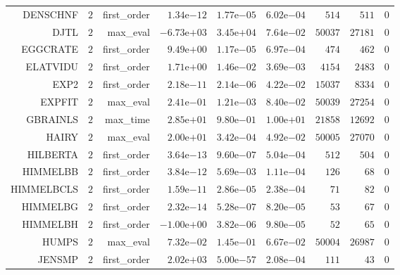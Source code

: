 \begin{longtable}{rrrrrrrrr}
DENSCHNF & \(     2\) & first\_order & \( 1.34\)e\(-12\) & \( 1.77\)e\(-05\) & \( 6.02\)e\(-04\) & \(   514\) & \(   511\) & \(     0\) \\
DJTL & \(     2\) & max\_eval & \(-6.73\)e\(+03\) & \( 3.45\)e\(+04\) & \( 7.64\)e\(-02\) & \( 50037\) & \( 27181\) & \(     0\) \\
EGGCRATE & \(     2\) & first\_order & \( 9.49\)e\(+00\) & \( 1.17\)e\(-05\) & \( 6.97\)e\(-04\) & \(   474\) & \(   462\) & \(     0\) \\
ELATVIDU & \(     2\) & first\_order & \( 1.71\)e\(+00\) & \( 1.46\)e\(-02\) & \( 3.69\)e\(-03\) & \(  4154\) & \(  2483\) & \(     0\) \\
EXP2 & \(     2\) & first\_order & \( 2.18\)e\(-11\) & \( 2.14\)e\(-06\) & \( 4.22\)e\(-02\) & \( 15037\) & \(  8334\) & \(     0\) \\
EXPFIT & \(     2\) & max\_eval & \( 2.41\)e\(-01\) & \( 1.21\)e\(-03\) & \( 8.40\)e\(-02\) & \( 50039\) & \( 27254\) & \(     0\) \\
GBRAINLS & \(     2\) & max\_time & \( 2.85\)e\(+01\) & \( 9.80\)e\(-01\) & \( 1.00\)e\(+01\) & \( 21858\) & \( 12692\) & \(     0\) \\
HAIRY & \(     2\) & max\_eval & \( 2.00\)e\(+01\) & \( 3.42\)e\(-04\) & \( 4.92\)e\(-02\) & \( 50005\) & \( 27070\) & \(     0\) \\
HILBERTA & \(     2\) & first\_order & \( 3.64\)e\(-13\) & \( 9.60\)e\(-07\) & \( 5.04\)e\(-04\) & \(   512\) & \(   504\) & \(     0\) \\
HIMMELBB & \(     2\) & first\_order & \( 3.84\)e\(-12\) & \( 5.69\)e\(-03\) & \( 1.11\)e\(-04\) & \(   126\) & \(    68\) & \(     0\) \\
HIMMELBCLS & \(     2\) & first\_order & \( 1.59\)e\(-11\) & \( 2.86\)e\(-05\) & \( 2.38\)e\(-04\) & \(    71\) & \(    82\) & \(     0\) \\
HIMMELBG & \(     2\) & first\_order & \( 2.32\)e\(-14\) & \( 5.28\)e\(-07\) & \( 8.20\)e\(-05\) & \(    53\) & \(    67\) & \(     0\) \\
HIMMELBH & \(     2\) & first\_order & \(-1.00\)e\(+00\) & \( 3.82\)e\(-06\) & \( 9.80\)e\(-05\) & \(    52\) & \(    65\) & \(     0\) \\
HUMPS & \(     2\) & max\_eval & \( 7.32\)e\(-02\) & \( 1.45\)e\(-01\) & \( 6.67\)e\(-02\) & \( 50004\) & \( 26987\) & \(     0\) \\
JENSMP & \(     2\) & first\_order & \( 2.02\)e\(+03\) & \( 5.00\)e\(-57\) & \( 2.08\)e\(-04\) & \(   111\) & \(    43\) & \(     0\) \\

\end{longtable}
